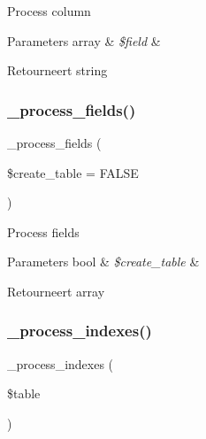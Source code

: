 Process column


\begin{DoxyParams}[1]{Parameters}
array & {\em \$field} & \\
\hline
\end{DoxyParams}
\begin{DoxyReturn}{Retourneert}
string 
\end{DoxyReturn}
\mbox{\label{class_c_i___d_b__forge_ae469322e7aad35ff5689973878175922}} 
\subsubsection{\texorpdfstring{\_process\_fields()}{\_process\_fields()}}
{\footnotesize\ttfamily \+\_\+process\+\_\+fields (\begin{DoxyParamCaption}\item[{}]{\$create\+\_\+table = {\ttfamily FALSE} }\end{DoxyParamCaption})\hspace{0.3cm}{\ttfamily [protected]}}

Process fields


\begin{DoxyParams}[1]{Parameters}
bool & {\em \$create\+\_\+table} & \\
\hline
\end{DoxyParams}
\begin{DoxyReturn}{Retourneert}
array 
\end{DoxyReturn}
\mbox{\label{class_c_i___d_b__forge_ae0bdb4ea3418590d1894c5b621b5ca50}} 
\subsubsection{\texorpdfstring{\_process\_indexes()}{\_process\_indexes()}}
{\footnotesize\ttfamily \+\_\+process\+\_\+indexes (\begin{DoxyParamCaption}\item[{}]{\$table }\end{DoxyParamCaption})\hspace{0.3cm}{\ttfamily [protected]}}

